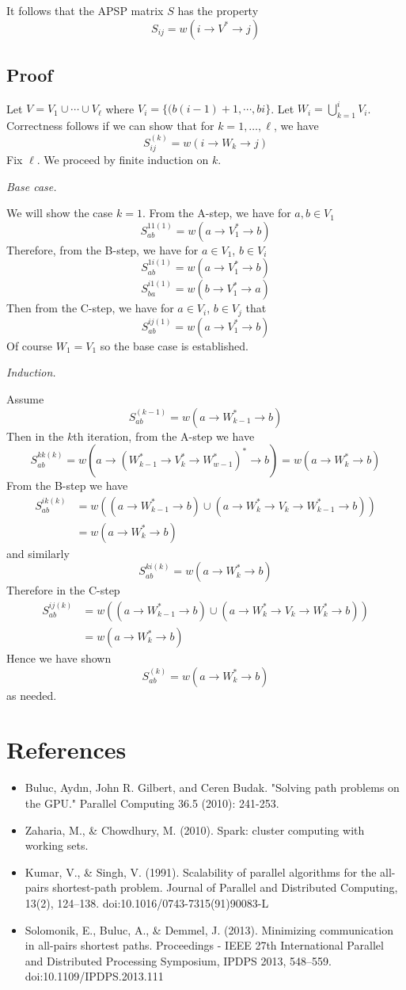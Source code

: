\documentclass{article} %
\begin{document}
It follows that the APSP matrix $S$ has the property
\[
S_{ij} = w(i \to V^* \to j)
\]

\subsection{Proof}

Let $V = V_1 \cup \cdots \cup V_\ell$ where $V_i = \{(b(i-1) + 1, \cdots, bi\}$.
Let $W_i = \bigcup_{k=1}^i V_i$.
Correctness follows if we can show that for $k = 1,\hdots, \ell$, we have
\[
S^{(k)}_{ij} = w(i \to W_k \to j)
\]
Fix $\ell$. We proceed by finite induction on $k$.

\emph{Base case.}

We will show the case $k = 1$.
From the A-step, we have for $a, b \in V_1$
\[
S^{11(1)}_{ab} = w(a \to V_1^* \to b)
\]
Therefore, from the B-step, we have for $a \in V_1$, $b \in V_i$
\[
S^{1i(1)}_{ab} = w(a \to V_1^* \to b) 
\]
\[
S^{i1(1)}_{ba} = w(b \to V_1^* \to a) 
\]
Then from the C-step, we have for $a \in V_i$, $b \in V_j$ that
\[
S^{ij(1)}_{ab} = w(a \to V_1^* \to b)
\]
Of course $W_1 = V_1$ so the base case is established.

\emph{Induction.}

Assume
\[
S^{(k-1)}_{ab} = w(a \to W_{k-1}^* \to b)
\]
Then in the $k$th iteration, from the A-step we have
\[
S^{kk(k)}_{ab} = w(a \to (W_{k-1}^* \to V_k^* \to W_{w-1}^*)^* \to b) = w(a \to W_k^* \to b)
\]
From the B-step we have
\begin{align*}
S^{ik(k)}_{ab} &= w((a \to W_{k-1}^* \to b) \cup (a \to W_k^* \to V_k \to W_{k-1}^* \to b))\\
&= w(a \to W_k^* \to b)
\end{align*}
and similarly
\[
S^{ki(k)}_{ab} = w(a \to W_k^* \to b)
\]
Therefore in the C-step
\begin{align*}
S^{ij(k)}_{ab} &= w((a \to W_{k-1}^* \to b) \cup (a \to W_k^* \to V_k \to W_k^* \to b))\\
&= w(a \to W_k^* \to b)
\end{align*}
Hence we have shown
\[
S^{(k)}_{ab} = w(a \to W_k^* \to b)
\]
as needed.

\section{References}
\begin{itemize}
\item Buluc, Aydın, John R. Gilbert, and Ceren Budak. "Solving path problems on the GPU." Parallel Computing 36.5 (2010): 241-253.
\item Zaharia, M., \& Chowdhury, M. (2010). Spark: cluster computing with working sets.
\item Kumar, V., \& Singh, V. (1991). Scalability of parallel algorithms for the all-pairs shortest-path problem. Journal of Parallel and Distributed Computing, 13(2), 124–138. doi:10.1016/0743-7315(91)90083-L
\item Solomonik, E., Buluc, A., \& Demmel, J. (2013). Minimizing communication in all-pairs shortest paths. Proceedings - IEEE 27th International Parallel and Distributed Processing Symposium, IPDPS 2013, 548–559. doi:10.1109/IPDPS.2013.111
\end{itemize}
\end{document}
